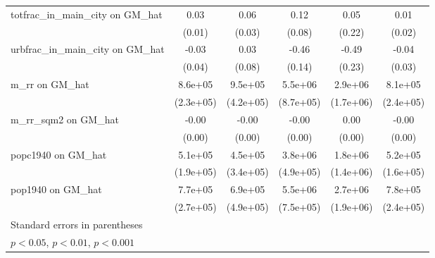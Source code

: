 \begin{table}[htbp]
\begin{tabular}{l*{5}{c}}
\addlinespace
totfrac\_in\_main\_city on GM\_hat&     0.03         &     0.06         &     0.12         &     0.05         &     0.01         \\
                &   (0.01)         &   (0.03)         &   (0.08)         &   (0.22)         &   (0.02)         \\
\addlinespace
urbfrac\_in\_main\_city on GM\_hat&    -0.03         &     0.03         &    -0.46\sym{***}&    -0.49\sym{*}  &    -0.04         \\
                &   (0.04)         &   (0.08)         &   (0.14)         &   (0.23)         &   (0.03)         \\
\addlinespace
m\_rr on GM\_hat  &  8.6e+05\sym{***}&  9.5e+05\sym{*}  &  5.5e+06\sym{***}&  2.9e+06         &  8.1e+05\sym{***}\\
                &(2.3e+05)         &(4.2e+05)         &(8.7e+05)         &(1.7e+06)         &(2.4e+05)         \\
\addlinespace
m\_rr\_sqm2 on GM\_hat&    -0.00         &    -0.00         &    -0.00         &     0.00         &    -0.00         \\
                &   (0.00)         &   (0.00)         &   (0.00)         &   (0.00)         &   (0.00)         \\
\addlinespace
popc1940 on GM\_hat&  5.1e+05\sym{**} &  4.5e+05         &  3.8e+06\sym{***}&  1.8e+06         &  5.2e+05\sym{**} \\
                &(1.9e+05)         &(3.4e+05)         &(4.9e+05)         &(1.4e+06)         &(1.6e+05)         \\
\addlinespace
pop1940 on GM\_hat&  7.7e+05\sym{**} &  6.9e+05         &  5.5e+06\sym{***}&  2.7e+06         &  7.8e+05\sym{**} \\
                &(2.7e+05)         &(4.9e+05)         &(7.5e+05)         &(1.9e+06)         &(2.4e+05)         \\
\bottomrule
\multicolumn{6}{l}{\footnotesize Standard errors in parentheses}\\
\multicolumn{6}{l}{\footnotesize \sym{*} \(p<0.05\), \sym{**} \(p<0.01\), \sym{***} \(p<0.001\)}\\
\end{tabular}
\end{table}
